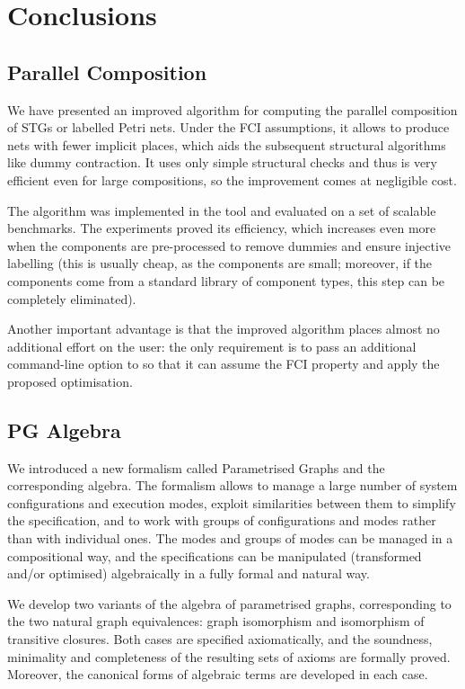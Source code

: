 \chapter{Conclusions\label{chap:Conclusion}}

\section{Parallel Composition}

We have presented an improved algorithm for computing the
parallel composition of STGs or labelled Petri nets. Under the
FCI assumptions, it allows to produce nets with fewer implicit
places, which aids the subsequent structural algorithms like
dummy contraction. It uses only simple structural checks and
thus is very efficient even for large compositions, so the
improvement comes at negligible cost.

The algorithm was implemented in the \pcomp tool and evaluated
on a set of scalable benchmarks. The experiments proved its
efficiency, which increases even more when the components are
pre-processed to remove dummies and ensure injective labelling
(this is usually cheap, as the components are small; moreover,
if the components come from a standard library of component
types, this step can be completely eliminated).

Another important advantage is that the improved algorithm
places almost no additional effort on the user: the only
requirement is to pass an additional command-line option to
\pcomp so that it can assume the FCI property and apply the
proposed optimisation.


\section{PG Algebra}

We introduced a new formalism called Parametrised Graphs and the
corresponding algebra. The formalism allows to manage a large number
of system configurations and execution modes, exploit similarities
between them to simplify the specification, and to work with groups
of configurations and modes rather than with individual ones. The
modes and groups of modes can be managed in a compositional way, and
the specifications can be manipulated (transformed and/or optimised)
algebraically in a fully formal and natural way.

We develop two variants of the algebra of parametrised graphs, corresponding
to the two natural graph equivalences: graph isomorphism and isomorphism
of transitive closures. Both cases are specified axiomatically, and
the soundness, minimality and completeness of the resulting sets of
axioms are formally proved. Moreover, the canonical forms of algebraic
terms are developed in each case.

